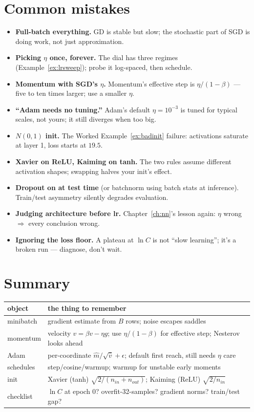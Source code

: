 \section{Common mistakes}
\label{sec:trainmistakes}

\begin{itemize}
\item \textbf{Full-batch everything.} GD is stable but slow; the
stochastic part of SGD is doing work, not just approximation.
\item \textbf{Picking $\eta$ once, forever.} The dial has three
regimes (Example~\ref{ex:lrsweep}); probe it log-spaced, then schedule.
\item \textbf{Momentum with SGD's $\eta$.} Momentum's effective step
is $\eta/(1-\beta)$ --- five to ten times larger; use a smaller $\eta$.
\item \textbf{``Adam needs no tuning.''} Adam's default $\eta=10^{-3}$
is tuned for typical scales, not yours; it still diverges when too
big.
\item \textbf{$N(0,1)$ init.} The Worked Example~\ref{ex:badinit}
failure: activations saturate at layer 1, loss starts at $19.5$.
\item \textbf{Xavier on ReLU, Kaiming on tanh.} The two rules assume
different activation shapes; swapping halves your init's effect.
\item \textbf{Dropout on at test time} (or batchnorm using batch stats
at inference). Train/test asymmetry silently degrades evaluation.
\item \textbf{Judging architecture before lr.} Chapter~\ref{ch:nn}'s
lesson again: $\eta$ wrong $\Rightarrow$ every conclusion wrong.
\item \textbf{Ignoring the loss floor.} A plateau at $\ln C$ is not
``slow learning''; it's a broken run --- diagnose, don't wait.
\end{itemize}

\section{Summary}
\label{sec:trainsummary}

\begin{center}\small
\begin{tabular}{p{}p{}}
\toprule
object & the thing to remember \\
\midrule
minibatch & gradient estimate from $B$ rows; noise escapes saddles \\
momentum & velocity $v=\beta v-\eta g$; use $\eta/(1-\beta)$ for
effective step; Nesterov looks ahead \\
Adam & per-coordinate $\hat m/\sqrt{\hat v}+\epsilon$; default first
reach, still needs $\eta$ care \\
schedules & step/cosine/warmup; warmup for unstable early moments \\
init & Xavier (tanh) $\sqrt{2/(n_{in}+n_{out})}$; Kaiming (ReLU)
$\sqrt{2/n_{in}}$ \\
checklist & $\ln C$ at epoch 0? overfit-32-samples? gradient norms?
train/test gap? \\
\bottomrule
\end{tabular}
\end{center}

